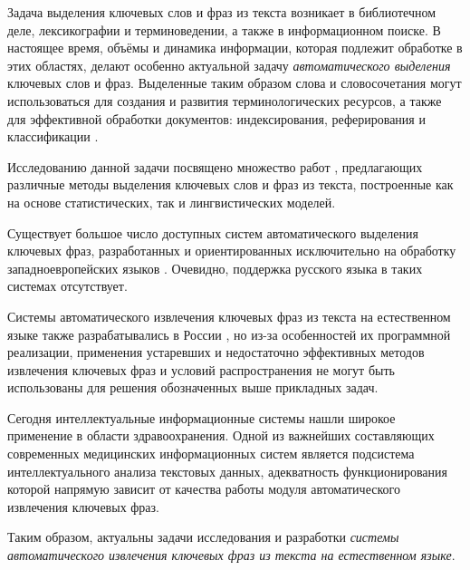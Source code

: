 \Introduction
Задача выделения ключевых слов и фраз из текста возникает в
библиотечном деле, лексикографии и терминоведении, а также в
информационном поиске. В настоящее время, объёмы и динамика
информации, которая подлежит обработке в этих областях, делают
особенно актуальной задачу \emph{автоматического выделения}
ключевых слов и фраз. Выделенные таким образом слова и
словосочетания могут использоваться для создания и развития
терминологических ресурсов, а также для эффективной обработки
документов: индексирования, реферирования и классификации
\cite{Braslavsky06}.

Исследованию данной задачи посвящено множество работ
\cite{Medelyan09,Turney00,Frantzi00,Witten99}, предлагающих
различные методы выделения ключевых слов и фраз из текста,
построенные как на основе статистических, так и лингвистических
моделей.

Существует большое число доступных систем автоматического выделения
ключевых фраз, разработанных и ориентированных исключительно на
обработку западноевропейских языков
\cite{OpenCalais,Extractor,YahooTermExtractionWebService,TerMine,Maui}. Очевидно,
поддержка русского языка в таких системах отсутствует.

Системы автоматического извлечения ключевых фраз из текста на
естественном языке также разрабатывались в России
\cite{TextAnalyst,AOTSynAn,ContentAnalyzer,SemanticMirror},
но из-за особенностей их программной реализации,
применения устаревших и недостаточно эффективных методов извлечения
ключевых фраз \cite{Braslavsky06,Braslavsky07,Braslavsky08}
и условий распространения не могут быть использованы для решения
обозначенных выше прикладных задач.

Сегодня интеллектуальные информационные системы нашли широкое
применение в области здравоохранения. Одной из важнейших
составляющих современных медицинских информационных систем является
подсистема интеллектуального анализа текстовых данных, адекватность
функционирования которой напрямую зависит от качества работы модуля
автоматического извлечения ключевых фраз.

Таким образом, актуальны задачи исследования и разработки \emph{системы
автоматического извлечения ключевых фраз из текста на естественном
языке}.

